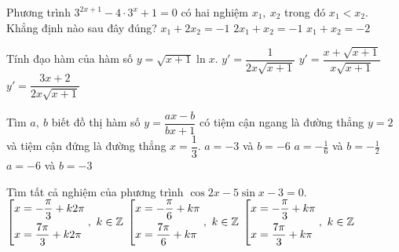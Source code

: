 \begin{ex}%
Phương trình $3^{2x+1}-4\cdot 3^x+1=0$ có hai nghiệm $x_1,\ x_2$ trong đó $x_1<x_2$. Khẳng định nào sau đây đúng?	
	{\True $x_1+2x_2=-1$}
	{$2x_1+x_2=-1$}
	{$x_1+x_2=-2$}
\end{ex}
\begin{ex}%
Tính đạo hàm của hàm số $y=\sqrt{x+1}\ln x$.
	{$y'=\dfrac{1}{2x\sqrt{x+1}}$}
	{$y'=\dfrac{x+\sqrt{x+1}}{x\sqrt{x+1}}$}
	{$y'=\dfrac{3x+2}{2x\sqrt{x+1}}$}
\end{ex}
\begin{ex}%
Tìm $a,\ b$ biết đồ thị hàm số $y=\dfrac{ax-b}{bx+1}$ có tiệm cận ngang là đường thẳng $y=2$ và tiệm cận đứng là	đường thẳng $x=\dfrac{1}{3}$.
	{$a=-3$ và $b=-6$}
	{$a=-\frac{1}{6}$ và $b=-\frac{1}{2}$}
	{\True $a=-6$ và $b=-3$}
\end{ex}
\begin{ex}%
Tìm tất cả nghiệm của phương trình $\cos2x-5\sin x-3=0$.
	{$\hoac{&x=-\dfrac{\pi}{3}+k2\pi\\&x=\dfrac{7\pi}{3}+k2\pi},\ k\in\mathbb{Z}$}
	{$\hoac{&x=-\dfrac{\pi}{6}+k\pi\\&x=\dfrac{7\pi}{6}+k\pi},\ k\in\mathbb{Z}$}
	{$\hoac{&x=-\dfrac{\pi}{3}+k\pi\\&x=\dfrac{7\pi}{3}+k\pi},\ k\in\mathbb{Z}$}
\end{ex}
